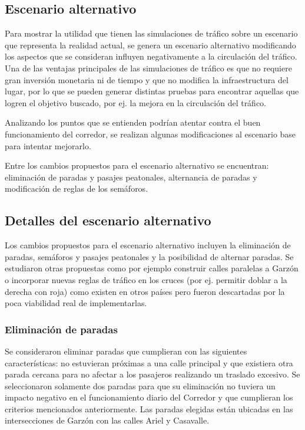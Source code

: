 \subsection{Escenario alternativo}

Para mostrar la utilidad que tienen las simulaciones de tráfico sobre un escenario que representa la realidad actual, se genera un escenario alternativo modificando los aspectos que se consideran influyen negativamente a la circulación del tráfico. Una de las ventajas principales de las simulaciones de tráfico es que no requiere gran inversión monetaria ni de tiempo y que no modifica la infraestructura del lugar, por lo que se pueden generar distintas pruebas para encontrar aquellas que logren el objetivo buscado, por ej. la mejora en la circulación del tráfico.

Analizando los puntos que se entienden podrían atentar contra el buen funcionamiento del corredor, se realizan algunas modificaciones al escenario base para intentar mejorarlo. 

Entre los cambios propuestos para el escenario alternativo se encuentran: eliminación de paradas y pasajes peatonales, alternancia de paradas y modificación de reglas de los semáforos.

\subsection{Detalles del escenario alternativo}
Los cambios propuestos para el escenario alternativo incluyen la eliminación de paradas, semáforos y pasajes peatonales y la posibilidad de alternar paradas. Se estudiaron otras propuestas como por ejemplo construir calles paralelas a Garzón o incorporar nuevas reglas de tráfico en los cruces (por ej. permitir doblar a la derecha con roja) como existen en otros países pero fueron descartadas por la poca viabilidad real de implementarlas.

\subsubsection{Eliminación de paradas}
Se consideraron eliminar paradas que cumplieran con las siguientes características: no estuvieran próximas a una calle principal y que existiera otra parada cercana para no afectar a los pasajeros realizando un traslado excesivo.  Se seleccionaron solamente dos paradas para que su eliminación no tuviera un impacto negativo en el funcionamiento diario del Corredor y que cumplieran los criterios mencionados anteriormente. Las paradas elegidas están ubicadas en las intersecciones de Garzón con las calles Ariel y Casavalle.

